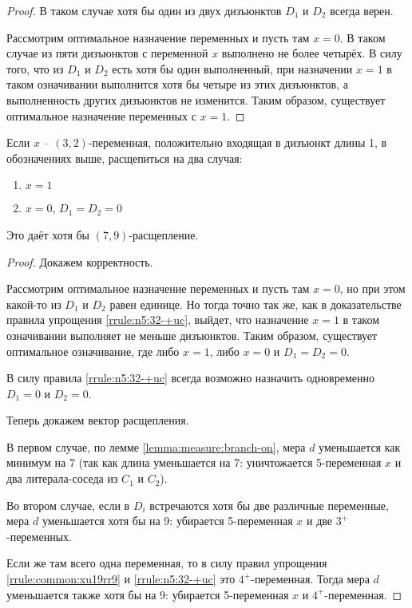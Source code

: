 \begin{proof}
  В таком случае хотя бы один из двух дизъюнктов $D_1$ и $D_2$ всегда верен.

  Рассмотрим оптимальное назначение переменных и пусть там $x = 0$. В таком случае из пяти дизъюнктов с переменной $x$ выполнено не более четырёх. В силу того, что из $D_1$ и $D_2$ есть хотя бы один выполненный, при назначении $x = 1$ в таком означивании выполнится хотя бы четыре из этих дизъюнктов, а выполненность других дизъюнктов не изменится. Таким образом, существует оптимальное назначение переменных с $x = 1$.
\end{proof}

\begin{brule}
 Если $x$ -- $(3,2)$-переменная, положительно входящая в дизъюнкт длины 1, в обозначениях выше, расщепиться на два случая:

 \begin{enumerate}
  \item $x = 1$
  \item $x = 0$, $D_1 = D_2 = 0$
 \end{enumerate}

 Это даёт хотя бы $(7,9)$-расщепление.
 \label{brule:n5:32-+uc}
\end{brule}

\begin{proof}
 Докажем корректность.

 Рассмотрим оптимальное назначение переменных и пусть там $x = 0$, но при этом какой-то из $D_1$ и $D_2$ равен единице. Но тогда точно так же, как в доказательстве правила упрощения \ref{rrule:n5:32-+uc}, выйдет, что назначение $x = 1$ в таком означивании выполняет не меньше дизъюнктов. Таким образом, существует оптимальное означивание, где либо $x = 1$, либо $x = 0$ и $D_1 = D_2 = 0$.

 В силу правила \ref{rrule:n5:32-+uc} всегда возможно назначить одновременно $D_1 = 0$ и $D_2 = 0$.

 Теперь докажем вектор расщепления.

 В первом случае, по лемме \ref{lemma:measure:branch-on}, мера $d$ уменьшается как минимум на 7 (так как длина уменьшается на 7: уничтожается 5-переменная $x$ и два литерала-соседа из $C_1$ и $C_2$).

 Во втором случае, если в $D_i$ встречаются хотя бы две различные переменные, мера $d$ уменьшается хотя бы на 9: убирается 5-переменная $x$ и две $3^+$-переменных.

 Если же там всего одна переменная, то в силу правил упрощения \ref{rrule:common:xu19rr9} и \ref{rrule:n5:32-+uc} это $4^+$-переменная. Тогда мера $d$ уменьшается также хотя бы на 9: убирается 5-переменная $x$ и $4^+$-переменная.
\end{proof}

